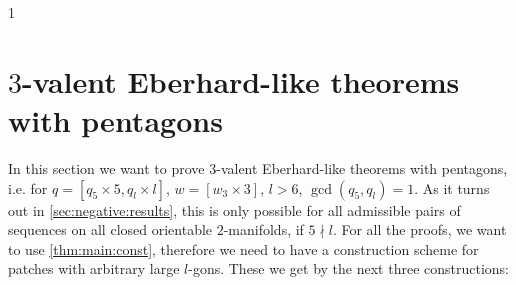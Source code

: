1\checkoddpage\ifoddpage\else\hbox{}\clearpage\fi%
\section{$3$-valent {\sc Eberhard}-like theorems with pentagons}\label{sec:5:3}

In this section we want to prove $3$-valent {\sc Eberhard}-like theorems with pentagons, i.e. for $q = [q_5 \times 5, q_l \times l]$, $w = [w_3 \times 3]$, $l > 6$, $\gcd(q_5, q_l) = 1$. As it turns out in \autoref{sec:negative:results}, this is only possible for all admissible pairs of sequences on all closed orientable $2$-manifolds, if $5 \nmid l$. For all the proofs, we want to use \autoref{thm:main:const}, therefore we need to have a construction scheme for patches with arbitrary large $l$-gons. These we get by the next three constructions:

